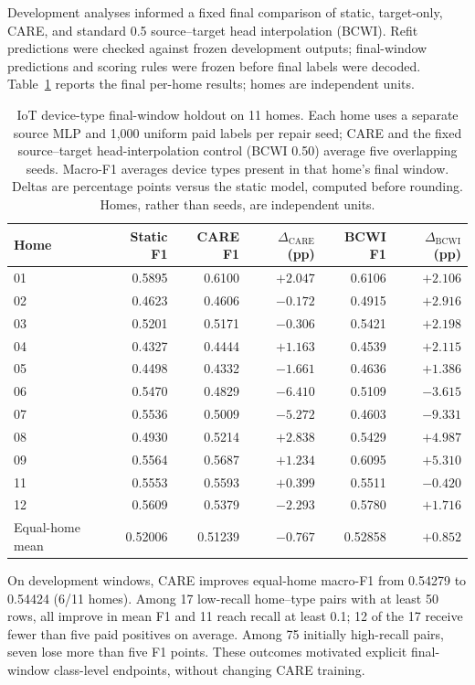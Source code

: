 \documentclass[journal]{IEEEtran}
\newcommand{\ours}{CARE}  %
\begin{document}
Development analyses informed a fixed final comparison of static, target-only, CARE, and standard 0.5 source--target head interpolation (BCWI). Refit predictions were checked against frozen development outputs; final-window predictions and scoring rules were frozen before final labels were decoded. Table~\ref{tab:iot_homes} reports the final per-home results; homes are independent units.

\begin{table}[!t]
\centering
\caption{IoT device-type final-window holdout on 11 homes. Each home uses a separate source MLP and 1{,}000 uniform paid labels per repair seed; CARE and the fixed source--target head-interpolation control (BCWI 0.50) average five overlapping seeds. Macro-F1 averages device types present in that home's final window. Deltas are percentage points versus the static model, computed before rounding. Homes, rather than seeds, are independent units.}
\label{tab:iot_homes}
\small
\setlength{\tabcolsep}{7pt}
\begin{tabular}{@{}lrrrrr@{}}
\toprule
Home & Static F1 & \ours{} F1 & $\Delta_{\mathrm{CARE}}$ (pp) & BCWI F1 & $\Delta_{\mathrm{BCWI}}$ (pp) \\
\midrule
01 & 0.5895 & 0.6100 & $+2.047$ & 0.6106 & $+2.106$ \\
02 & 0.4623 & 0.4606 & $-0.172$ & 0.4915 & $+2.916$ \\
03 & 0.5201 & 0.5171 & $-0.306$ & 0.5421 & $+2.198$ \\
04 & 0.4327 & 0.4444 & $+1.163$ & 0.4539 & $+2.115$ \\
05 & 0.4498 & 0.4332 & $-1.661$ & 0.4636 & $+1.386$ \\
06 & 0.5470 & 0.4829 & $-6.410$ & 0.5109 & $-3.615$ \\
07 & 0.5536 & 0.5009 & $-5.272$ & 0.4603 & $-9.331$ \\
08 & 0.4930 & 0.5214 & $+2.838$ & 0.5429 & $+4.987$ \\
09 & 0.5564 & 0.5687 & $+1.234$ & 0.6095 & $+5.310$ \\
11 & 0.5553 & 0.5593 & $+0.399$ & 0.5511 & $-0.420$ \\
12 & 0.5609 & 0.5379 & $-2.293$ & 0.5780 & $+1.716$ \\
\midrule
Equal-home mean & 0.52006 & 0.51239 & $-0.767$ & 0.52858 & $+0.852$ \\
\bottomrule
\end{tabular}
\end{table}


On development windows, CARE improves equal-home macro-F1 from 0.54279 to 0.54424 (6/11 homes). Among 17 low-recall home--type pairs with at least 50 rows, all improve in mean F1 and 11 reach recall at least 0.1; 12 of the 17 receive fewer than five paid positives on average. Among 75 initially high-recall pairs, seven lose more than five F1 points. These outcomes motivated explicit final-window class-level endpoints, without changing CARE training.
\end{document}

